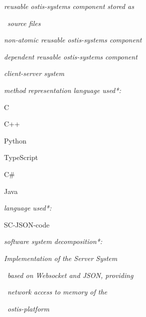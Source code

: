 \documentclass{article}
\begin{document}
\begin{multicols}{2}
\begin{description}[ labelwidth=0.75cm]
\begin{description}[ labelwidth=0.75cm]
\item [:=] [Network software interface of Implementation of
ostis-platform sc-memory]

\item [:=] [Our proposed option of implementing the mechanism for accessing the ostis-platform sc-memory
in a distributed collective of ostis-systems]

    \item [$\in$] \textit{reusable ostis-systems component stored as}\par \vspace{-0.15cm}
   \ \textit{source files}
    \item [$\in$] \textit{non-atomic reusable ostis-systems component}
    \item [$\in$] \textit{dependent reusable ostis-systems component}
    \item [$\in$] \textit{client-server system}

\item [$\Rightarrow$] \textit{method representation language used*:} 


 
\begin{description}[ labelwidth=0.75cm]
\item[\ •] C
\item[\ •] C++
\item[\ •] Python
\item[\ •] TypeScript
\item[\ •] C#
\item[\ •] Java
\end{description}

\item [$\Rightarrow$] \textit{language used*:} 

\begin{description}[ labelwidth=0.75cm]
\item[\ •] SC-JSON-code
\end{description}

\item [$\Rightarrow$] \textit{software system decomposition*:} 
\begin{description}[ labelwidth=0.75cm]
 \vspace{-0.15cm}
 \item[\ \{•] \textit{Implementation of the Server System}\par
 \ \textit{based on Websocket and JSON, providing}\par
\ \textit{network access to memory of the}\par
\ \textit{ostis-platform}
\item[\ \{ \}]


\end{description}
\end{description}
\end{description}
\end{multicols}
\end{document}
